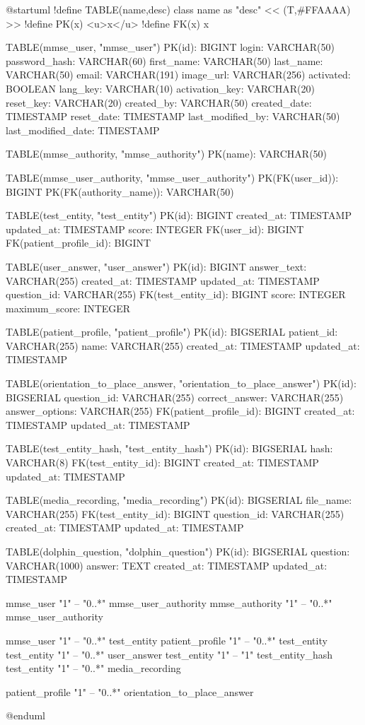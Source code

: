 @startuml
!define TABLE(name,desc) class name as "desc" << (T,#FFAAAA) >>
!define PK(x) <u>x</u>
!define FK(x) x

TABLE(mmse_user, "mmse_user") {
    PK(id): BIGINT
    login: VARCHAR(50)
    password_hash: VARCHAR(60)
    first_name: VARCHAR(50)
    last_name: VARCHAR(50)
    email: VARCHAR(191)
    image_url: VARCHAR(256)
    activated: BOOLEAN
    lang_key: VARCHAR(10)
    activation_key: VARCHAR(20)
    reset_key: VARCHAR(20)
    created_by: VARCHAR(50)
    created_date: TIMESTAMP
    reset_date: TIMESTAMP
    last_modified_by: VARCHAR(50)
    last_modified_date: TIMESTAMP
}

TABLE(mmse_authority, "mmse_authority") {
    PK(name): VARCHAR(50)
}

TABLE(mmse_user_authority, "mmse_user_authority") {
    PK(FK(user_id)): BIGINT
    PK(FK(authority_name)): VARCHAR(50)
}

TABLE(test_entity, "test_entity") {
    PK(id): BIGINT
    created_at: TIMESTAMP
    updated_at: TIMESTAMP
    score: INTEGER
    FK(user_id): BIGINT
    FK(patient_profile_id): BIGINT
}

TABLE(user_answer, "user_answer") {
    PK(id): BIGINT
    answer_text: VARCHAR(255)
    created_at: TIMESTAMP
    updated_at: TIMESTAMP
    question_id: VARCHAR(255)
    FK(test_entity_id): BIGINT
    score: INTEGER
    maximum_score: INTEGER
}

TABLE(patient_profile, "patient_profile") {
    PK(id): BIGSERIAL
    patient_id: VARCHAR(255)
    name: VARCHAR(255)
    created_at: TIMESTAMP
    updated_at: TIMESTAMP
}

TABLE(orientation_to_place_answer, "orientation_to_place_answer") {
    PK(id): BIGSERIAL
    question_id: VARCHAR(255)
    correct_answer: VARCHAR(255)
    answer_options: VARCHAR(255)
    FK(patient_profile_id): BIGINT
    created_at: TIMESTAMP
    updated_at: TIMESTAMP
}

TABLE(test_entity_hash, "test_entity_hash") {
    PK(id): BIGSERIAL
    hash: VARCHAR(8)
    FK(test_entity_id): BIGINT
    created_at: TIMESTAMP
    updated_at: TIMESTAMP
}

TABLE(media_recording, "media_recording") {
    PK(id): BIGSERIAL
    file_name: VARCHAR(255)
    FK(test_entity_id): BIGINT
    question_id: VARCHAR(255)
    created_at: TIMESTAMP
    updated_at: TIMESTAMP
}

TABLE(dolphin_question, "dolphin_question") {
    PK(id): BIGSERIAL
    question: VARCHAR(1000)
    answer: TEXT
    created_at: TIMESTAMP
    updated_at: TIMESTAMP
}

mmse_user "1" -- "0..*" mmse_user_authority
mmse_authority "1" -- "0..*" mmse_user_authority

mmse_user "1" -- "0..*" test_entity
patient_profile "1" -- "0..*" test_entity
test_entity "1" -- "0..*" user_answer
test_entity "1" -- "1" test_entity_hash
test_entity "1" -- "0..*" media_recording

patient_profile "1" -- "0..*" orientation_to_place_answer

@enduml
